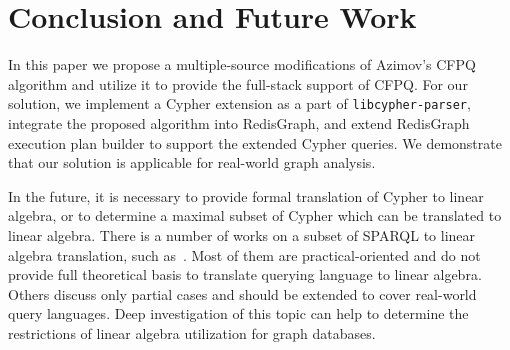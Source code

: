 \section{Conclusion and Future Work}
In this paper we propose a multiple-source modifications of Azimov's CFPQ algorithm and utilize it to provide the full-stack support of CFPQ.
For our solution, we implement a Cypher extension as a part of \texttt{libcypher-parser}, integrate the proposed algorithm into RedisGraph, and extend RedisGraph execution plan builder to support the extended Cypher queries.
We demonstrate that our solution is applicable for real-world graph analysis.

In the future, it is necessary to provide formal translation of Cypher to linear algebra, or to determine a maximal subset of Cypher which can be translated to linear algebra.
There is a number of works on a subset of SPARQL to linear algebra translation, such as~\cite{10.14778/3229863.3236239,10.1007/978-3-642-34002-4_36,DBLP:journals/corr/MetzlerM15a}.
Most of them are practical-oriented and do not provide full theoretical basis to translate querying language to linear algebra.
Others discuss only partial cases and should be extended to cover real-world query languages.
Deep investigation of this topic can help to determine the restrictions of linear algebra utilization for graph databases.


